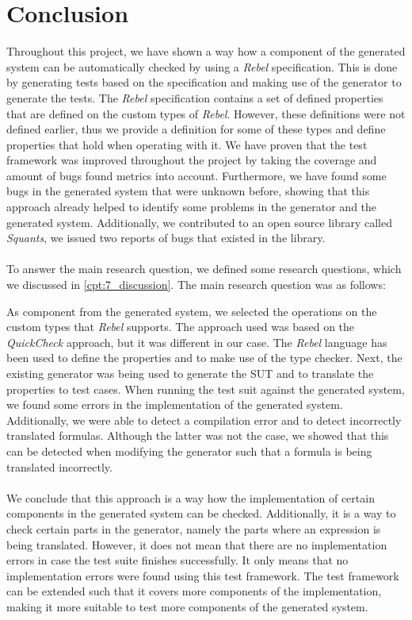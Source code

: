 \chapter{Conclusion}
\label{chp:conclusion}
Throughout this project, we have shown a way how a component of the generated system can be automatically checked by using a \textit{Rebel} specification. This is done by generating tests based on the specification and making use of the generator to generate the tests. The \textit{Rebel} specification contains a set of defined properties that are defined on the custom types of \textit{Rebel}. However, these definitions were not defined earlier, thus we provide a definition for some of these types and  define properties that hold when operating with it. We have proven that the test framework was improved throughout the project by taking the coverage and amount of bugs found metrics into account. Furthermore, we have found some bugs in the generated system that were unknown before, showing that this approach already helped to identify some problems in the generator and the generated system. Additionally, we contributed to an open source library called \textit{Squants}, we issued two reports of bugs that existed in the library.\\
\\
To answer the main research question, we defined some research questions, which we discussed in \autoref{cpt:7_discussion}. The main research question was as follows:
\begin{quote}
\rqMain
\end{quote}
As component from the generated system, we selected the operations on the custom types that \textit{Rebel} supports. The approach used was based on the \textit{QuickCheck} approach, but it was different in our case. The \textit{Rebel} language has been used to define the properties and to make use of the type checker. Next, the existing generator was being used to generate the SUT and to translate the properties to test cases. When running the test suit against the generated system, we found some errors in the implementation of the generated system. Additionally, we were able to detect a compilation error and to detect incorrectly translated formulas. Although the latter was not the case, we showed that this can be detected when modifying the generator such that a formula is being translated incorrectly.\\
\\
We conclude that this approach is a way how the implementation of certain components in the generated system can be checked. Additionally, it is a way to check certain parts in the generator, namely the parts where an expression is being translated. However, it does not mean that there are no implementation errors in case the test suite finishes successfully. It only means that no implementation errors were found using this test framework. The test framework can be extended such that it covers more components of the implementation, making it more suitable to test more components of the generated system.

